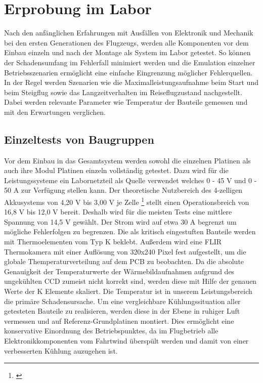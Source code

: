 \chapter{Erprobung im Labor}\label{cha:Erprobung im Labor}

Nach den anfänglichen Erfahrungen mit Ausfällen von Elektronik und Mechanik bei den ersten Generationen des Flugzeugs, werden alle Komponenten vor dem Einbau einzeln und nach der Montage als System im Labor getestet.
So können der Schadensumfang im Fehlerfall minimiert werden und die Emulation einzelner Betriebsszenarien ermöglicht eine einfache Eingrenzung möglicher Fehlerquellen.
In der Regel werden Szenarien wie die Maximalleistungsaufnahme beim Start und beim  Steigflug sowie das Langzeitverhalten im Reiseflugzustand nachgestellt. Dabei werden relevante Parameter wie Temperatur der Bauteile gemessen und mit den Erwartungen verglichen.

\section{Einzeltests von Baugruppen}

Vor dem Einbau in das Gesamtsystem werden sowohl die einzelnen Platinen als auch ihre Modul Platinen einzeln vollständig getestet.
Dazu wird für die Leistungssysteme ein Labornetzteil als Quelle verwendet welches 0 - 45 V und 0 - 50 A zur Verfügung stellen kann.
Der theoretische Nutzbereich des 4-zelligen Akkusystems von 4,20 V bis 3,00 V je Zelle \footnote{\cite[Seite~1.12f.]{Reddy2010}} stellt einen Operationsbreich von 16,8 V bis 12,0 V bereit. Deshalb wird für die meisten Tests eine mittlere Spannung von 14,5 V gewählt. Der Strom wird auf etwa 30 A begrenzt um mögliche Fehlerfolgen zu begrenzen.
Die als kritisch eingestuften Bauteile werden mit Thermoelementen vom Typ K beklebt. Außerdem wird eine FLIR Thermokamera mit einer Auflösung von 320x240 Pixel fest aufgestellt, um die globale Themperaturverteilung auf dem PCB zu beobachten.
Da die absolute Genauigkeit der Temperaturwerte der Wärmebildaufnahmen aufgrund des ungekühlten CCD zumeist nicht korrekt sind, werden diese mit Hilfe der genauen Werte der K Elemente skaliert.
Die Temperatur ist in unserem Leistungsbereich die primäre Schadensursache. 
Um eine vergleichbare Kühlungssituation aller getesteten Bauteile zu realisieren, werden diese in der Ebene in ruhiger Luft vermessen und auf Referenz-Grundplatinen montiert.
Dies ermöglicht eine konservative Einordnung des Betriebspunktes, da im Flugbetrieb alle Elektronikkomponenten vom Fahrtwind überspült werden und damit von einer verbesserten Kühlung auzugehen ist.

